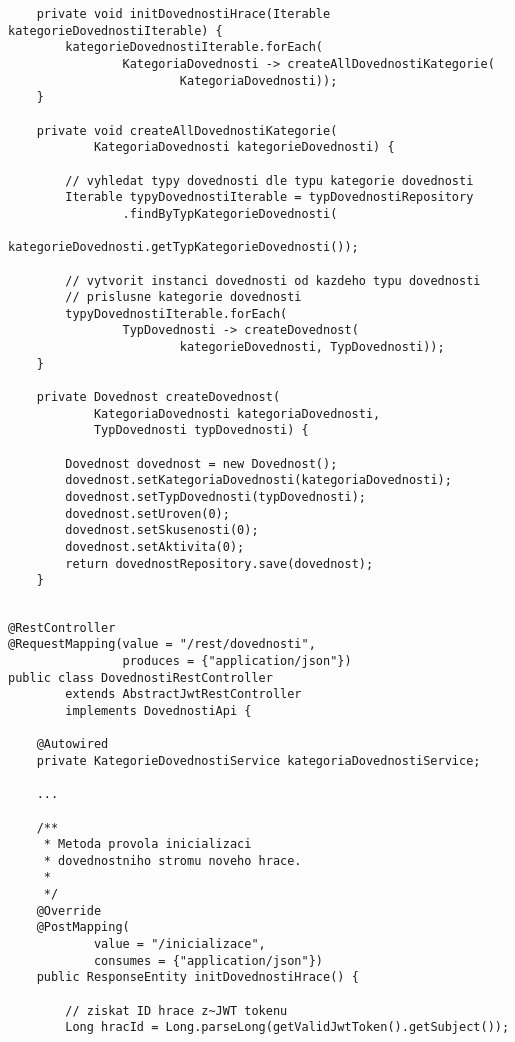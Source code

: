 \documentclass[twoside, 12pt]{article}
\begin{document}
{{\begin{lstlisting}
    private void initDovednostiHrace(Iterable kategorieDovednostiIterable) {
        kategorieDovednostiIterable.forEach(
                KategoriaDovednosti -> createAllDovednostiKategorie(
                        KategoriaDovednosti));
    }

    private void createAllDovednostiKategorie(
            KategoriaDovednosti kategorieDovednosti) {

        // vyhledat typy dovednosti dle typu kategorie dovednosti
        Iterable typyDovednostiIterable = typDovednostiRepository
                .findByTypKategorieDovednosti(
                        kategorieDovednosti.getTypKategorieDovednosti());

        // vytvorit instanci dovednosti od kazdeho typu dovednosti
        // prislusne kategorie dovednosti
        typyDovednostiIterable.forEach(
                TypDovednosti -> createDovednost(
                        kategorieDovednosti, TypDovednosti));
    }

    private Dovednost createDovednost(
            KategoriaDovednosti kategoriaDovednosti,
            TypDovednosti typDovednosti) {

        Dovednost dovednost = new Dovednost();
        dovednost.setKategoriaDovednosti(kategoriaDovednosti);
        dovednost.setTypDovednosti(typDovednosti);
        dovednost.setUroven(0);
        dovednost.setSkusenosti(0);
        dovednost.setAktivita(0);
        return dovednostRepository.save(dovednost);
    }


\end{lstlisting}

\clearpage


\begin{lstlisting}
@RestController
@RequestMapping(value = "/rest/dovednosti",
                produces = {"application/json"})
public class DovednostiRestController
        extends AbstractJwtRestController
        implements DovednostiApi {

    @Autowired
    private KategorieDovednostiService kategoriaDovednostiService;

    ...

    /**
     * Metoda provola inicializaci
     * dovednostniho stromu noveho hrace.
     *
     */
    @Override
    @PostMapping(
            value = "/inicializace",
            consumes = {"application/json"})
    public ResponseEntity initDovednostiHrace() {

        // ziskat ID hrace z~JWT tokenu
        Long hracId = Long.parseLong(getValidJwtToken().getSubject());


\end{lstlisting}}}
\end{document}
